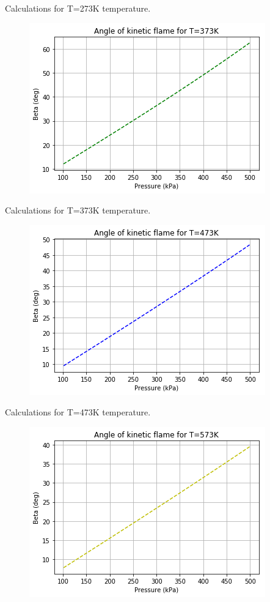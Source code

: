 \documentclass[a4paper]{article}
\begin{document}
Calculations for T=273K temperature.
\begin{figure}[!h]
\centering
\includegraphics[scale=0.5]{2.png}
\end{figure}

Calculations for T=373K temperature.
\begin{figure}[!h]
\centering
\includegraphics[scale=0.5]{3.png}
\end{figure}

Calculations for T=473K temperature.
\begin{figure}[!h]
\centering
\includegraphics[scale=0.5]{4.png}
\end{figure}
\end{document}
